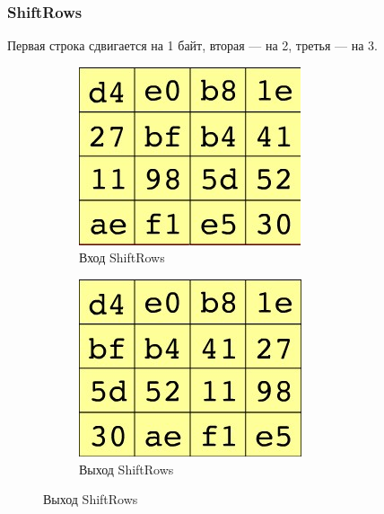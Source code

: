 \documentclass[a4paper, 14pt]{extarticle}
\begin{document}
\FloatBarrier{}
\subsubsection{ShiftRows}
Первая строка сдвигается на 1 байт, вторая --- на 2, третья --- на 3.
\begin{figure}[h]
    \centering
    \begin{subfigure}[b]{0.3\textwidth}
    	\includegraphics[width=\textwidth]{img/S006.jpg}
    	\caption{Вход ShiftRows}
    \end{subfigure}%
    \hspace{1cm}
    \begin{subfigure}[b]{0.3\textwidth}
    	\includegraphics[width=\textwidth]{img/S007.jpg}
    	\caption{Выход ShiftRows}
    \end{subfigure}
\end{figure}
\end{document}
